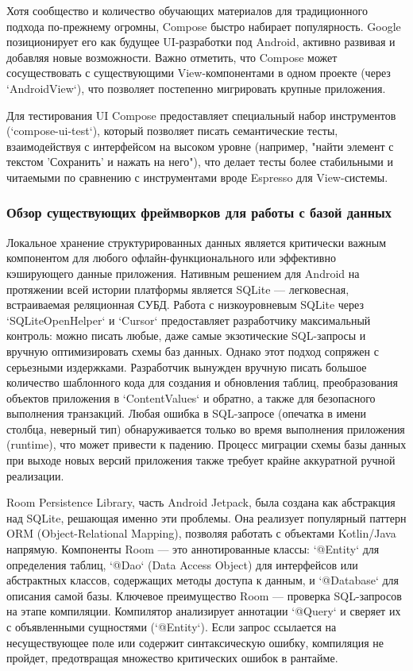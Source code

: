 Хотя сообщество и количество обучающих материалов для традиционного подхода по-прежнему огромны, Compose быстро набирает популярность. Google позиционирует его как будущее UI-разработки под Android, активно развивая и добавляя новые возможности. Важно отметить, что Compose может сосуществовать с существующими View-компонентами в одном проекте (через `AndroidView`), что позволяет постепенно мигрировать крупные приложения.

Для тестирования UI Compose предоставляет специальный набор инструментов (`compose-ui-test`), который позволяет писать семантические тесты, взаимодействуя с интерфейсом на высоком уровне (например, "найти элемент с текстом 'Сохранить' и нажать на него"), что делает тесты более стабильными и читаемыми по сравнению с инструментами вроде Espresso для View-системы. \cite{refe}

\subsubsection{Обзор существующих фреймворков для работы с базой данных}

Локальное хранение структурированных данных является критически важным компонентом для любого офлайн-функционального или эффективно кэширующего данные приложения. Нативным решением для Android на протяжении всей истории платформы является SQLite — легковесная, встраиваемая реляционная СУБД. Работа с низкоуровневым SQLite через `SQLiteOpenHelper` и `Cursor` предоставляет разработчику максимальный контроль: можно писать любые, даже самые экзотические SQL-запросы и вручную оптимизировать схемы баз данных. Однако этот подход сопряжен с серьезными издержками. Разработчик вынужден вручную писать большое количество шаблонного кода для создания и обновления таблиц, преобразования объектов приложения в `ContentValues` и обратно, а также для безопасного выполнения транзакций. Любая ошибка в SQL-запросе (опечатка в имени столбца, неверный тип) обнаруживается только во время выполнения приложения (runtime), что может привести к падению. Процесс миграции схемы базы данных при выходе новых версий приложения также требует крайне аккуратной ручной реализации. \cite{reff}

Room Persistence Library, часть Android Jetpack, была создана как абстракция над SQLite, решающая именно эти проблемы. Она реализует популярный паттерн ORM (Object-Relational Mapping), позволяя работать с объектами Kotlin/Java напрямую. Компоненты Room — это аннотированные классы: `@Entity` для определения таблиц, `@Dao` (Data Access Object) для интерфейсов или абстрактных классов, содержащих методы доступа к данным, и `@Database` для описания самой базы. Ключевое преимущество Room — проверка SQL-запросов на этапе компиляции. Компилятор анализирует аннотации `@Query` и сверяет их с объявленными сущностями (`@Entity`). Если запрос ссылается на несуществующее поле или содержит синтаксическую ошибку, компиляция не пройдет, предотвращая множество критических ошибок в рантайме.


